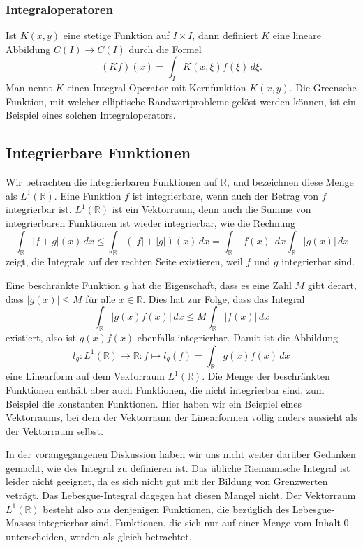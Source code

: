 \subsubsection{Integraloperatoren}
Ist $K(x,y)$ eine stetige Funktion auf $I\times I$, dann definiert $K$
eine lineare Abbildung $C(I)\to C(I)$ durch die Formel
\[
(Kf)(x) = \int_I K(x,\xi)f(\xi)\,d\xi.
\]
Man nennt $K$ einen Integral-Operator mit Kernfunktion $K(x,y)$.
Die Greensche Funktion, mit welcher elliptische Randwertprobleme
gelöst werden können, ist ein Beispiel eines solchen Integraloperators.

\subsection{Integrierbare Funktionen}
Wir betrachten die integrierbaren Funktionen auf $\mathbb R$, und bezeichnen
diese Menge als $L^1(\mathbb R)$.
Eine Funktion $f$ ist integrierbare, wenn auch der Betrag von $f$
integrierbar ist.
$L^1(\mathbb R)$ ist ein Vektorraum, denn auch die Summe von integrierbaren
Funktionen ist wieder integrierbar, wie die Rechnung
\[
\int_{\mathbb R} |f+g|(x)\,dx
\le
\int_{\mathbb R} (|f| +|g|)(x)\,dx
=
\int_{\mathbb R} |f(x)|\,dx \int_{\mathbb R} |g(x)|\,dx
\]
zeigt, die Integrale auf der rechten Seite existieren, weil $f$ und $g$
integrierbar sind.

Eine beschränkte Funktion $g$ hat die Eigenschaft, dass es eine Zahl $M$ 
gibt derart, dass $|g(x)|\le M$ für alle $x\in\mathbb R$.
Dies hat zur Folge, dass das Integral
\[
\int_{\mathbb R} |g(x)f(x)|\,dx
\le
M\int_{\mathbb R} |f(x)|\,dx
\]
existiert, also ist $g(x)f(x)$ ebenfalls integrierbar.
Damit ist die Abbildung
\[
l_g\colon L^1(\mathbb R)\to \mathbb R: f \mapsto l_g(f)=\int_{\mathbb R} g(x)f(x)\,dx
\]
eine Linearform  auf dem Vektorraum $L^1(\mathbb R)$. 
Die Menge der beschränkten Funktionen enthält aber auch Funktionen, die
nicht integrierbar sind, zum Beispiel die konstanten Funktionen.
Hier haben wir ein Beispiel eines Vektorraums, bei dem der Vektorraum
der Linearformen völlig anders aussieht als der Vektorraum selbst.

In der vorangegangenen Diskussion haben wir uns nicht weiter darüber
Gedanken gemacht, wie des Integral zu definieren ist.
Das übliche Riemannsche Integral ist leider nicht geeignet, da es
sich nicht gut mit der Bildung von Grenzwerten veträgt.
Das Lebesgue-Integral dagegen hat diesen Mangel nicht.
Der Vektorraum $L^1(\mathbb R)$ besteht also aus denjenigen
Funktionen, die bezüglich des Lebesgue-Masses integrierbar sind.
Funktionen, die sich nur auf einer Menge vom Inhalt $0$ unterscheiden,
werden als gleich betrachtet.

